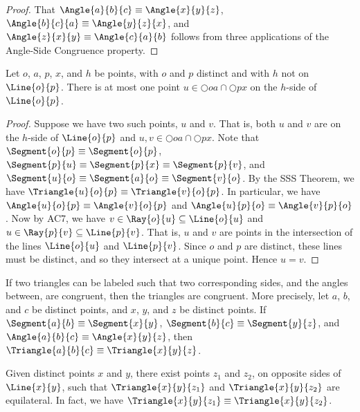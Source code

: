 \documentclass{article}
\begin{document}
\begin{proof}
That $\Angle{a}{b}{c} \equiv \Angle{x}{y}{z}$, $\Angle{b}{c}{a} \equiv \Angle{y}{z}{x}$, and $\Angle{z}{x}{y} \equiv \Angle{c}{a}{b}$ follows from three applications of the Angle-Side Congruence property.
\end{proof}

\begin{prop}
Let $o$, $a$, $p$, $x$, and $h$ be points, with $o$ and $p$ distinct and with $h$ not on $\Line{o}{p}$. There is at most one point $u \in \Circle{o}{a} \cap \Circle{p}{x}$ on the $h$-side of $\Line{o}{p}$.
\end{prop}

\begin{proof}
Suppose we have two such points, $u$ and $v$. That is, both $u$ and $v$ are on the $h$-side of $\Line{o}{p}$ and $u,v \in \Circle{o}{a} \cap \Circle{p}{x}$. Note that $\Segment{o}{p} \equiv \Segment{o}{p}$, $\Segment{p}{u} \equiv \Segment{p}{x} \equiv \Segment{p}{v}$, and $\Segment{u}{o} \equiv \Segment{a}{o} \equiv \Segment{v}{o}$. By the SSS Theorem, we have $\Triangle{u}{o}{p} \equiv \Triangle{v}{o}{p}$. In particular, we have $\Angle{u}{o}{p} \equiv \Angle{v}{o}{p}$ and $\Angle{u}{p}{o} \equiv \Angle{v}{p}{o}$. Now by AC7, we have $v \in \Ray{o}{u} \subseteq \Line{o}{u}$ and $u \in \Ray{p}{v} \subseteq \Line{p}{v}$. That is, $u$ and $v$ are points in the intersection of the lines $\Line{o}{u}$ and $\Line{p}{v}$. Since $o$ and $p$ are distinct, these lines must be distinct, and so they intersect at a unique point. Hence $u = v$.
\end{proof}

\begin{prop}
If two triangles can be labeled such that two corresponding sides, and the angles between, are congruent, then the triangles are congruent. More precisely, let $a$, $b$, and $c$ be distinct points, and $x$, $y$, and $z$ be distinct points. If $\Segment{a}{b} \equiv \Segment{x}{y}$, $\Segment{b}{c} \equiv \Segment{y}{z}$, and $\Angle{a}{b}{c} \equiv \Angle{x}{y}{z}$, then $\Triangle{a}{b}{c} \equiv \Triangle{x}{y}{z}$.
\end{prop}

\begin{construct}
Given distinct points $x$ and $y$, there exist points $z_1$ and $z_2$, on opposite sides of $\Line{x}{y}$, such that $\Triangle{x}{y}{z_1}$ and $\Triangle{x}{y}{z_2}$ are equilateral. In fact, we have $\Triangle{x}{y}{z_1} \equiv \Triangle{x}{y}{z_2}$.
\end{construct}
\end{document}
